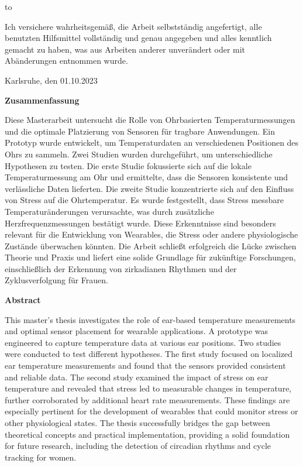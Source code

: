 \thispagestyle{empty}
\vspace*{42\baselineskip}
\hbox to \textwidth{\hrulefill}
\par
Ich versichere wahrheitsgemäß, die Arbeit selbstständig angefertigt, alle benutzten Hilfsmittel vollständig und genau angegeben und alles kenntlich gemacht zu haben, was aus Arbeiten anderer unverändert oder mit Abänderungen entnommen wurde.

Karlsruhe, den 01.10.2023

\cleardoublepage

\vspace*{1em}
\begin{center}
	\textbf{Zusammenfassung}
\end{center}
\par
Diese Masterarbeit untersucht die Rolle von Ohrbasierten Temperaturmessungen und die optimale Platzierung von Sensoren für tragbare Anwendungen.
Ein Prototyp wurde entwickelt, um Temperaturdaten an verschiedenen Positionen des Ohrs zu sammeln.
Zwei Studien wurden durchgeführt, um unterschiedliche Hypothesen zu testen.
Die erste Studie fokussierte sich auf die lokale Temperaturmessung am Ohr und ermittelte, dass die Sensoren konsistente und verlässliche Daten lieferten.
Die zweite Studie konzentrierte sich auf den Einfluss von Stress auf die Ohrtemperatur.
Es wurde festgestellt, dass Stress messbare Temperaturänderungen verursachte, was durch zusätzliche Herzfrequenzmessungen bestätigt wurde.
Diese Erkenntnisse sind besonders relevant für die Entwicklung von Wearables, die Stress oder andere physiologische Zustände überwachen könnten.
Die Arbeit schließt erfolgreich die Lücke zwischen Theorie und Praxis und liefert eine solide Grundlage für zukünftige Forschungen, einschließlich der Erkennung von zirkadianen Rhythmen und der Zyklusverfolgung für Frauen.

\cleardoublepage
\vspace*{1em}
\begin{center}
	\textbf{Abstract}
\end{center}
\par
This master's thesis investigates the role of ear-based temperature measurements and optimal sensor placement for wearable applications.
A prototype was engineered to capture temperature data at various ear positions.
Two studies were conducted to test different hypotheses.
The first study focused on localized ear temperature measurements and found that the sensors provided consistent and reliable data.
The second study examined the impact of stress on ear temperature and revealed that stress led to measurable changes in temperature, further corroborated by additional heart rate measurements.
These findings are especially pertinent for the development of wearables that could monitor stress or other physiological states.
The thesis successfully bridges the gap between theoretical concepts and practical implementation, providing a solid foundation for future research, including the detection of circadian rhythms and cycle tracking for women.

\cleardoublepage

